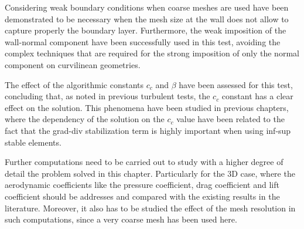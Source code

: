 Considering weak boundary conditions when coarse meshes are used have been demonstrated to be necessary when the mesh size at the wall does not allow to capture properly the boundary layer. Furthermore, the weak imposition of the wall-normal component have been successfully used in this test, avoiding the complex techniques that are required for the strong imposition of only the normal component on curvilinean geometries.

The effect of the algorithmic constants $ c_c $ and $ \beta $ have been assessed for this test, concluding that, as noted in previous turbulent tests, the $ c_c $ constant has a clear effect on the solution. This phenomena have been studied in previous chapters, where the dependency of the solution on the $ c_c $ value have been related to the fact that the grad-div stabilization term is highly important when using inf-sup stable elements.

Further computations need to be carried out to study with a higher degree of detail the problem solved in this chapter. Particularly for the 3D case, where the aerodynamic coefficients like the pressure coefficient, drag coefficient and lift coefficient should be addresses and compared with the existing results in the literature. Moreover, it also has to be studied the effect of the mesh resolution in such computations, since a very coarse mesh has been used here.




